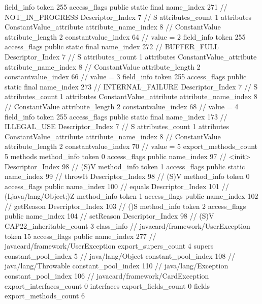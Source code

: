 {{{{{{{				}
				}
			}
			field_info {
				token	255
				access_flags	public static final
				name_index	271		// NOT_IN_PROGRESS
				Descriptor_Index	7		// S
				attributes_count	1
				attributes {
				ConstantValue_attribute {
					attribute_name_index	8		// ConstantValue
					attribute_length	2
					constantvalue_index	64		// value = 2
				}
				}
			}
			field_info {
				token	255
				access_flags	public static final
				name_index	272		// BUFFER_FULL
				Descriptor_Index	7		// S
				attributes_count	1
				attributes {
				ConstantValue_attribute {
					attribute_name_index	8		// ConstantValue
					attribute_length	2
					constantvalue_index	66		// value = 3
				}
				}
			}
			field_info {
				token	255
				access_flags	public static final
				name_index	273		// INTERNAL_FAILURE
				Descriptor_Index	7		// S
				attributes_count	1
				attributes {
				ConstantValue_attribute {
					attribute_name_index	8		// ConstantValue
					attribute_length	2
					constantvalue_index	68		// value = 4
				}
				}
			}
			field_info {
				token	255
				access_flags	public static final
				name_index	173		// ILLEGAL_USE
				Descriptor_Index	7		// S
				attributes_count	1
				attributes {
				ConstantValue_attribute {
					attribute_name_index	8		// ConstantValue
					attribute_length	2
					constantvalue_index	70		// value = 5
				}
				}
			}
			}
			export_methods_count	5
			methods {
				method_info {
					token	0
					access_flags	public
					name_index	97		// <init>
					Descriptor_Index	98		// (S)V
				}
				method_info {
					token	1
					access_flags	public static
					name_index	99		// throwIt
					Descriptor_Index	98		// (S)V
				}
				method_info {
					token	0
					access_flags	public
					name_index	100		// equals
					Descriptor_Index	101		// (Ljava/lang/Object;)Z
				}
				method_info {
					token	1
					access_flags	public
					name_index	102		// getReason
					Descriptor_Index	103		// ()S
				}
				method_info {
					token	2
					access_flags	public
					name_index	104		// setReason
					Descriptor_Index	98		// (S)V
				}
			}
			CAP22_inheritable_count	3
		}
		class_info {		// javacard/framework/UserException
			token	15
			access_flags	public
			name_index	277		// javacard/framework/UserException
			export_supers_count	4
			supers {
				constant_pool_index	5		// java/lang/Object
				constant_pool_index	108		// java/lang/Throwable
				constant_pool_index	110		// java/lang/Exception
				constant_pool_index	106		// javacard/framework/CardException
			}
			export_interfaces_count	0
			interfaces {
			}
			export_fields_count	0
			fields {
			}
			export_methods_count	6
}}}
